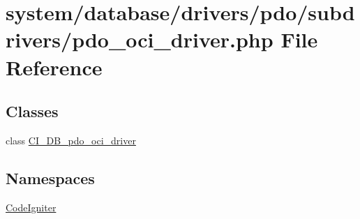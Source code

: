 \hypertarget{pdo__oci__driver_8php}{}\section{system/database/drivers/pdo/subdrivers/pdo\+\_\+oci\+\_\+driver.php File Reference}
\label{pdo__oci__driver_8php}
\subsection*{Classes}
\begin{DoxyCompactItemize}
\item 
class \mbox{\hyperlink{class_c_i___d_b__pdo__oci__driver}{C\+I\+\_\+\+D\+B\+\_\+pdo\+\_\+oci\+\_\+driver}}
\end{DoxyCompactItemize}
\subsection*{Namespaces}
\begin{DoxyCompactItemize}
\item 
 \mbox{\hyperlink{namespace_code_igniter}{Code\+Igniter}}
\end{DoxyCompactItemize}
